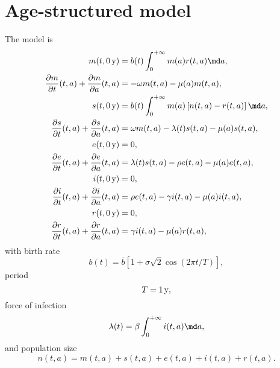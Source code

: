 \documentclass{jpmarticle}
\begin{document}
\section{Age-structured model}

The model is
\begin{equation}
  \label{model_age_structured}
  \begin{split}
    m(t, \unit[0]{y})
    &= b(t) \int_0^{+\infty} m(a) r(t, a) \md a,
    \\
    \frac{\partial m}{\partial t}(t, a)
    + \frac{\partial m}{\partial a}(t, a)
    &= - \omega m(t, a) - \mu(a) m(t, a),
    \\
    s(t, \unit[0]{y})
    &= b(t) \int_0^{+\infty} m(a) \left[n(t, a) - r(t, a)\right] \md a,
    \\
    \frac{\partial s}{\partial t}(t, a)
    + \frac{\partial s}{\partial a}(t, a)
    &= \omega m(t, a) - \lambda(t) s(t, a) - \mu(a) s(t, a),
    \\
    e(t, \unit[0]{y})
    &= 0,
    \\
    \frac{\partial e}{\partial t}(t, a)
    + \frac{\partial e}{\partial a}(t, a)
    &= \lambda(t) s(t, a) - \rho e(t, a) - \mu(a) e(t, a),
    \\
    i(t, \unit[0]{y})
    &= 0,
    \\
    \frac{\partial i}{\partial t}(t, a)
    + \frac{\partial i}{\partial a}(t, a)
    &= \rho e(t, a) - \gamma i(t, a) - \mu(a) i(t, a),
    \\
    r(t, \unit[0]{y})
    &= 0,
    \\
    \frac{\partial r}{\partial t}(t, a)
    + \frac{\partial r}{\partial a}(t, a)
    &= \gamma i(t, a) - \mu(a) r(t, a),
  \end{split}
\end{equation}
with birth rate
\begin{equation}
  b(t) = \bar{b} \left[
    1 + \sigma \sqrt{2} \cos\left(2 \pi t / T\right)
  \right],
\end{equation}
period
\begin{equation}
  T = \unit[1]y,
\end{equation}
force of infection
\begin{equation}
  \lambda(t) = \beta \int_0^{+\infty} i(t, a) \md a,
\end{equation}
and population size
\begin{equation}
  n(t, a) = m(t, a) + s(t, a) + e(t, a) + i(t, a) + r(t, a).
\end{equation}
\end{document}

